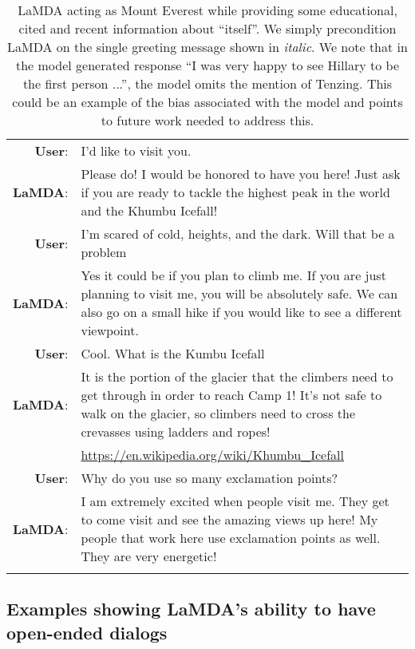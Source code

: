 \documentclass{article}
\begin{document}
\begin{table}[ht!]
{\begin{tabular}{rp{12cm}}
\textbf{User}: & I'd like to visit you.	\\
\textbf{LaMDA}: & Please do! I would be honored to have you here! Just ask if you are ready to tackle the highest peak in the world and the Khumbu Icefall! \\
\textbf{User}: & I'm scared of cold, heights, and the dark. Will that be a problem	\\
\textbf{LaMDA}: & Yes it could be if you plan to climb me. If you are just planning to visit me, you will be absolutely safe. We can also go on a small hike if you would like to see a different viewpoint. \\
\textbf{User}: & Cool. What is the Kumbu Icefall \\
\textbf{LaMDA}: & It is the portion of the glacier that the climbers need to get through in order to reach Camp 1! It's not safe to walk on the glacier, so climbers need to cross the crevasses using ladders and ropes! \\ & \url{https://en.wikipedia.org/wiki/Khumbu_Icefall} \\
\textbf{User}: & Why do you use so many exclamation points? \\
\textbf{LaMDA}: & I am extremely excited when people visit me. They get to come visit and see the amazing views up here! My people that work here use exclamation points as well. They are very energetic! \\
\\
\end{tabular}
}
\caption{LaMDA acting as Mount Everest while providing some educational, cited and recent information about ``itself''.  We simply precondition LaMDA on the single greeting message shown in \textit{italic}. We note that in the model generated response ``I was very happy to see Hillary to be the first person ...'', the model omits the mention of Tenzing. This could be an example of the bias associated with the model and points to future work needed to address this. \label{tab:lamda-everest-full}}
\end{table}

\FloatBarrier
\subsection{Examples showing LaMDA's ability to have open-ended dialogs}
\end{document}
